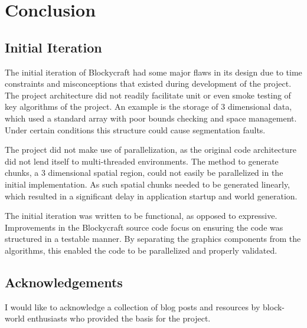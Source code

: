 \documentclass[a4paper,11pt,titlepage]{scrartcl}
\newcommand{\Blockycraft}{Blockycraft}
\begin{document}
\section{Conclusion}
\subsection{Initial Iteration}
The initial iteration of \Blockycraft{} had some major flaws in its design due to time constraints and misconceptions that existed during development of the project.  The project architecture did not readily facilitate unit or even smoke testing of key algorithms of the project.  An example is the storage of 3 dimensional data, which used a standard array with poor bounds checking and space management.  Under certain conditions this structure could cause segmentation faults.   

The project did not make use of parallelization, as the original code architecture did not lend itself to multi-threaded environments.  The method to generate chunks, a 3 dimensional spatial region, could not easily be parallelized in the initial implementation.  As such spatial chunks needed to be generated linearly, which resulted in a significant delay in application startup and world generation.

The initial iteration was written to be functional, as opposed to expressive.  Improvements in the \Blockycraft{} source code focus on ensuring the code was structured in a testable manner.  By separating the graphics components from the algorithms, this enabled the code to be parallelized and properly validated.

\subsection{Acknowledgements}
I would like to acknowledge a collection of blog posts and resources by block-world enthusiasts who provided the basis for the project.
\end{document}

